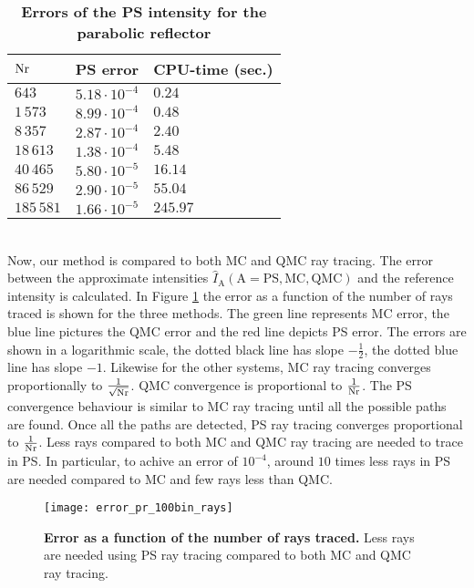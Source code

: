 \begin{table}[ht] \label{tab:table_pr_triangulation}
\centering
\caption{\bf Errors of the PS intensity for the parabolic reflector}
\begin{tabular}{lll}
 \hline   $\textrm{Nr}$ & PS error & CPU-time (sec.) \\
  \hline 
 $643$        & $5.18\cdot10^{-4}$ & $0.24$\\
 $1\,573$       & $8.99\cdot 10^{-4}$ & $0.48$\\
 $8\,357$     & $2.87\cdot 10^{-4}$ & $2.40$ \\
 $18\,613$     & $1.38\cdot 10^{-4}$ & $5.48$\\
 $40\,465$   & $5.80\cdot 10^{-5}$ & $16.14$\\
 $86\,529$    & $2.90\cdot 10^{-5}$ & $55.04$\\
 $185\,581$   & $1.66\cdot 10^{-5}$ & $245.97$\\
 \hline
 \end{tabular}
 \end{table}
\\ \indent 
Now, our method is compared to both MC and QMC ray tracing. 
The error between the approximate intensities $\hat{I}_{\textrm{A}}(\textrm{A}=\textrm{PS}, \textrm{MC}, \textrm{QMC})$ and the reference intensity is calculated. In Figure \ref{fig:error_rays_pr} the error as a function of the number of rays traced is shown for the three methods.
The green line represents MC error, the blue line pictures the QMC error and the red line depicts PS error. The errors are shown in a logarithmic scale, the dotted black line has slope $-\frac{1}{2}$, the dotted blue line has slope $-1$. Likewise for the other systems, MC ray tracing converges proportionally to $\frac{1}{\sqrt{\textrm{Nr}}}$. QMC convergence is proportional to $\frac{1}{\textrm{Nr}}$. The PS convergence behaviour is similar to MC ray tracing until all the possible paths are found. Once all the paths are detected, PS ray tracing converges proportional to $\frac{1}{\textrm{Nr}}$. Less rays compared to both MC and QMC ray tracing are needed to trace in PS. In particular, to achive an error of $10^{-4}$, around $10$ times less rays in PS are needed compared to MC and few rays less than QMC.
\begin{figure}[h!]
  \center
  \texttt{[image: error\_pr\_100bin\_rays]}
  \caption{\textbf{Error as a function of the number of rays traced.} Less rays are needed using PS ray tracing compared to both MC and QMC ray tracing.}
  \label{fig:error_rays_pr}
\end{figure} 
